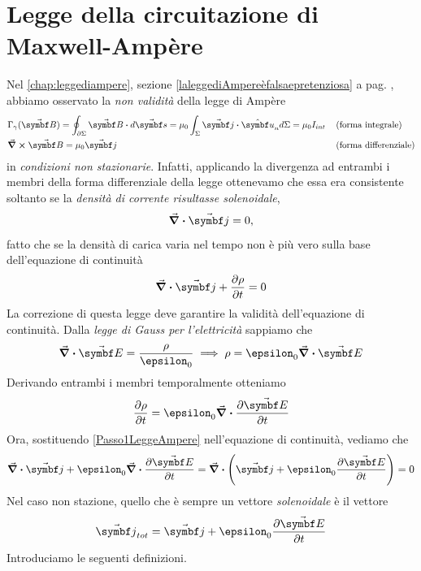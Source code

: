 \section{Legge della circuitazione di Maxwell-Ampère}
Nel \autoref{chap:leggediampere}, sezione \ref{laleggediAmpereèfalsaepretenziosa} a pag. \pageref{laleggediAmpereèfalsaepretenziosa}, abbiamo osservato la \textit{non validità} della legge di Ampère
\begin{align*}
	&\Gamma_{\gamma}(\vba{B})=\oint_{\partial \Sigma} \vba{B}\vdot d\vba{s}=\mu_0\int_{\Sigma}\vba{j}\vdot\vbh{u}_nd\Sigma=\mu_0 I_{int}	&& \left(\text{forma integrale}\right)\\
	&\curl{\vba{B}}=\mu_0\vba{j}	&& \left(\text{forma differenziale}\right)\\
\end{align*}
in \textit{condizioni non stazionarie}. Infatti, applicando la divergenza ad entrambi i membri della forma differenziale della legge ottenevamo che essa era consistente soltanto se la \textit{densità di corrente risultasse solenoidale},
\begin{equation}
	\div{\vba{j}}=0,
\end{equation}
fatto che se la densità di carica varia nel tempo non è più vero sulla base dell'equazione di continuità
\begin{equation*}
	\div{\vba{j}}+\pdv{\rho}{t}=0
\end{equation*}
La correzione di questa legge deve garantire la validità dell'equazione di continuità.
Dalla \textit{legge di Gauss per l'elettricità} sappiamo che
\begin{equation*}
	\div{\vba{E}}=\frac{\rho}{\epsilon_0}\implies \rho=\epsilon_0\div{\vba{E}}
\end{equation*}
Derivando entrambi i membri temporalmente otteniamo
\begin{equation}
	\pdv{\rho}{t}=\epsilon_0\div{\pdv{\vba{E}}{t}}\label{Passo1LeggeAmpere}
\end{equation}
Ora, sostituendo \eqref{Passo1LeggeAmpere} nell'equazione di continuità, vediamo che
\begin{equation}
	\div{\vba{j}}+\epsilon_0\div{\pdv{\vba{E}}{t}}=\div{\left(\vba{j}+\epsilon_0\pdv{\vba{E}}{t}\right)}=0
\end{equation}
Nel caso non stazione, quello che è sempre un vettore \textit{solenoidale} è il vettore
\begin{equation*}
	\vba{j}_{tot}=\vba{j}+\epsilon_0\pdv{\vba{E}}{t}
\end{equation*}
Introduciamo le seguenti definizioni.
